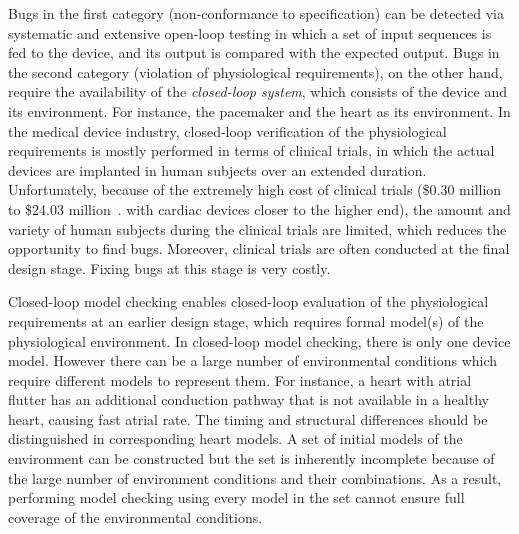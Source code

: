 Bugs in the first category (non-conformance to specification) can be detected via systematic and extensive open-loop testing in which a set of input sequences is fed to the device, and its output is compared with the expected output.
Bugs in the second category (violation of physiological requirements), on the other hand, require the availability of the \emph{closed-loop system}, which consists of the device and its environment.
For instance, the pacemaker and the heart as its environment. 
In the medical device industry, closed-loop verification of the physiological requirements is mostly performed in terms of clinical trials, in which the actual devices are implanted in human subjects over an extended duration.
Unfortunately, because of the extremely high cost of clinical trials (\$0.30
million to \$24.03 million~\cite{trial_cost}. with cardiac devices closer to the higher end), the amount and variety of human subjects during the clinical trials are limited, which reduces the opportunity to find bugs. 
Moreover, clinical trials are often conducted at the final design stage. Fixing bugs at this stage is very costly.

Closed-loop model checking enables closed-loop evaluation of the physiological requirements at an earlier design stage, which requires formal model(s) of the physiological environment. 
In closed-loop model checking, there is only one device model. 
However there can be a large number of environmental conditions which require different models to represent them. For instance, a heart with atrial flutter has an additional conduction pathway that is not available in a healthy heart, causing fast atrial rate. The timing and structural differences should be distinguished in corresponding heart models.
A set of initial models of the environment can be constructed but the set is inherently incomplete because of the large number of environment conditions and their combinations. 
As a result, performing model checking using every model in the set cannot ensure full coverage of the environmental conditions. 

